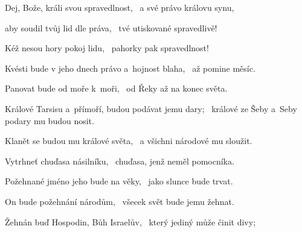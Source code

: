 \begin{psalmus}
 
Dej, Bože, králi svou spravedlnost,~\grestar{}
a své právo královu synu,~\Abardot{}

aby soudil tvůj lid dle práva,~\grestar{}
tvé utiskované spravedlivě!~\Abardot{}

Kéž nesou hory pokoj lidu,~\grestar{}
pahorky pak spravedlnost!~\Abardot{}

Kvésti bude v jeho dnech právo a~hojnost blaha,~\grestar{}
až pomine měsíc.~\Abardot{}

Panovat bude od moře k~moři,~\grestar{}
od Řeky až na konec světa.~\Abardot{}

Králové Tarsisu a~přímoří, budou podávat jemu dary;~\grestar{}
králové ze Šeby a~Seby podary mu budou nosit.~\Abardot{}

Klanět se budou mu králové světa,~\grestar{}
a všichni národové mu sloužit.~\Abardot{}

Vytrhneť chuďasa násilníku,~\grestar{}
chuďasa, jenž neměl pomocníka.~\Abardot{}

Požehnané jméno jeho bude na věky,~\grestar{}
jako slunce bude trvat.~\Abardot{}

On bude požehnání národům,~\grestar{}
všecek svět bude jemu žehnat.~\Abardot{}

Žehnán buď Hospodin, Bůh Israelův,~\grestar{}
který jediný může činit divy;~\Abardot{}
\end{psalmus}
